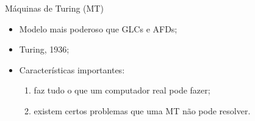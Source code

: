 \documentclass[xcolor=dvipsnames,table]{beamer}
\begin{document}
	\begin{frame}{Máquinas de Turing (MT)}
		\begin{itemize}
			\item Modelo mais poderoso que GLCs e AFDs; \pause
			\item Turing, 1936; \pause
			\item Características importantes:
				\begin{enumerate}
					\item faz tudo o que um computador real pode fazer;
					\item existem certos problemas que uma MT não pode resolver.
				\end{enumerate}				 
		\end{itemize}
	\end{frame}
	
	\begin{frame}
		\titlepage
	\end{frame}
	
\end{document}

